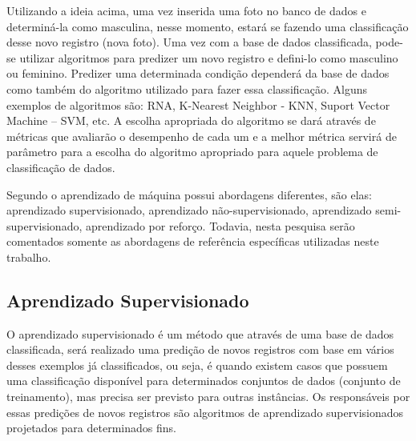 Utilizando a ideia acima, uma vez inserida uma foto no banco de dados e determiná-la como masculina, nesse momento, estará se fazendo uma classificação desse novo registro (nova foto). Uma vez com a base de dados classificada, pode-se utilizar algoritmos para predizer um novo registro e defini-lo como masculino ou feminino. Predizer uma determinada condição dependerá da base de dados como também do algoritmo utilizado para fazer essa classificação. Alguns exemplos de algoritmos são: RNA, K-Nearest Neighbor - KNN, Suport Vector Machine – SVM, etc. A escolha apropriada do algoritmo se dará através de métricas que avaliarão o desempenho de cada um e a melhor métrica servirá de parâmetro para a escolha do algoritmo apropriado para aquele problema de classificação de dados. 


Segundo  o aprendizado de máquina possui abordagens diferentes, são elas: aprendizado supervisionado, aprendizado não-supervisionado, aprendizado semi-supervisionado, aprendizado por reforço. Todavia, nesta pesquisa serão comentados somente as abordagens de referência específicas utilizadas neste trabalho.

\subsection{Aprendizado Supervisionado}\label{cap:refTeor:ssec:aprendSup}

O aprendizado supervisionado é um método que através de uma base de dados classificada, será realizado uma predição de novos registros com base em vários desses exemplos já classificados, ou seja, é quando existem casos que possuem uma classificação disponível para determinados conjuntos de dados (conjunto de treinamento), mas precisa ser previsto para outras instâncias. Os responsáveis por essas predições de novos registros são algoritmos de aprendizado supervisionados projetados para determinados fins.


